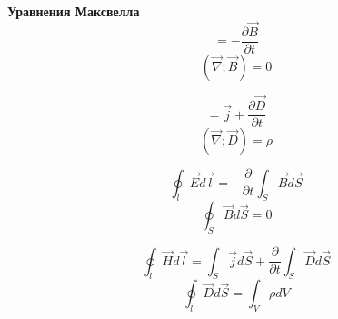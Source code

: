 \documentclass{article}
\begin{document}
	
	\textbf{Уравнения Максвелла}\\

	\begin{equation}
		[\vec\nabla;\vec E] = -\frac{\partial \vec B}{\partial t}
	\end{equation}
	\begin{equation}
		(\vec\nabla;\vec B) = 0
	\end{equation}

	\begin{equation}
		[\vec\nabla;\vec H] = \vec j + \frac{\partial\vec D}{\partial t}
	\end{equation}
	\begin{equation}
		(\vec\nabla;\vec D) = \rho
	\end{equation}


	\begin{equation}
		\oint_l \vec E d\vec l = -\frac{\partial}{\partial t}\int_S \vec B d\vec S
	\end{equation}
	\begin{equation}
		\oint_S \vec B d\vec S = 0
	\end{equation}

	\begin{equation}
		\oint_l \vec H d\vec l = \int_S \vec j d\vec S + \frac{\partial}{\partial t} \int_S \vec D d\vec S
	\end{equation}
	\begin{equation}
		\oint_l \vec D d\vec S = \int_V \rho dV
	\end{equation}
\end{document}
